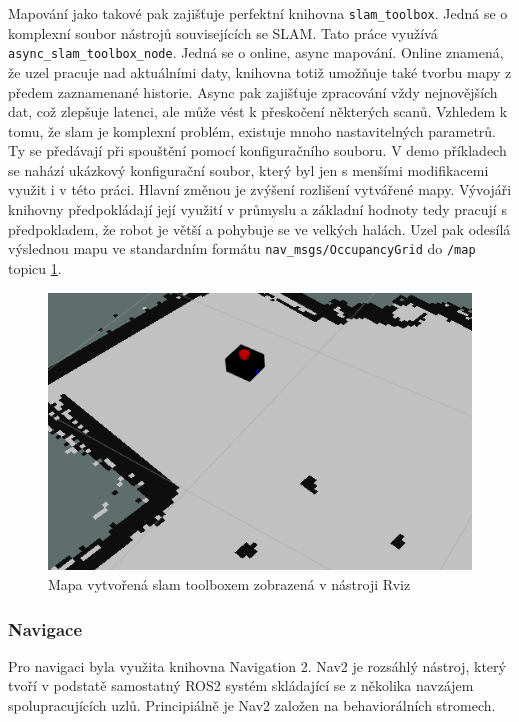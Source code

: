 Mapování jako takové pak zajišťuje perfektní knihovna \verb|slam_toolbox|. Jedná se o komplexní soubor nástrojů souvisejících se SLAM. Tato práce využívá \verb|async_slam_toolbox_node|. Jedná se o online, async mapování. Online znamená, že uzel pracuje nad aktuálními daty, knihovna totiž umožňuje také tvorbu mapy z předem zaznamenané historie. Async pak zajišťuje zpracování vždy nejnovějších dat, což zlepšuje latenci, ale může vést k přeskočení některých scanů. Vzhledem k tomu, že slam je komplexní problém, existuje mnoho nastavitelných parametrů. Ty se předávají při spouštění pomocí konfiguračního souboru. V demo příkladech se nahází ukázkový konfigurační soubor, který byl jen s menšími modifikacemi využit i v této práci. Hlavní změnou je zvýšení rozlišení vytvářené mapy. Vývojáři knihovny předpokládají její využití v průmyslu a základní hodnoty tedy pracují s předpokladem, že robot je větší a pohybuje se ve velkých halách. Uzel pak odesílá výslednou mapu ve standardním formátu \verb|nav_msgs/OccupancyGrid| do \verb|/map| topicu \ref{fig:rviz_slam_map}. 

\begin{figure}[h!]
	\centering
	\includegraphics[scale=0.7]{obrazky-figures/slam.png}
	\caption{Mapa vytvořená slam toolboxem zobrazená v nástroji Rviz}
	\label{fig:rviz_slam_map}
\end{figure}

\subsubsection*{Navigace}
Pro navigaci byla využita knihovna Navigation 2. Nav2 je rozsáhlý nástroj, který tvoří v podstatě samostatný ROS2 systém skládající se z několika navzájem spolupracujících uzlů. Principiálně je Nav2 založen na behaviorálních stromech.

